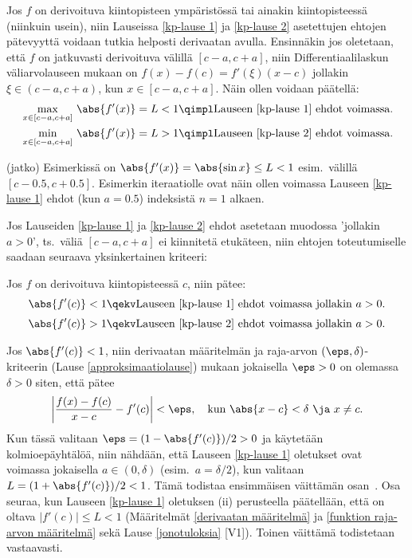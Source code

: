 Jos $f$ on derivoituva kiintopisteen ympäristössä tai ainakin kiintopisteessä (niinkuin usein),
niin Lauseissa \ref{kp-lause 1} ja \ref{kp-lause 2} asetettujen ehtojen pätevyyttä voidaan 
tutkia helposti derivaatan avulla. Ensinnäkin jos oletetaan, että $f$ on jatkuvasti derivoituva
välillä $[c-a,c+a]$, niin Differentiaalilaskun väliarvolauseen mukaan on 
$f(x)-f(c) = f'(\xi)(x-c)$ jollakin $\xi \in (c-a,c+a)$, kun $x \in [c-a,c+a]$. Näin ollen
voidaan päätellä:
\begin{align*}
&\max_{x \in [c-a,c+a]}\,\abs{f'(x)} = L<1 
                      \qimpl \text{Lauseen \ref{kp-lause 1} ehdot voimassa}. \\
&\min_{x \in [c-a,c+a]}\,\abs{f'(x)} = L>1 
                      \qimpl \text{Lauseen \ref{kp-lause 2} ehdot voimassa}.
\end{align*}
\jatko\jatko \begin{Exa} (jatko) Esimerkissä on $\abs{f'(x)} = \abs{\sin x} \le L<1$ esim.\
välillä $[c-0.5,c+0.5]$. Esimerkin iteraatiolle ovat näin ollen voimassa Lauseen
\ref{kp-lause 1} ehdot (kun $a=0.5$) indeksistä $n=1$ alkaen. \loppu
\end{Exa} \seur
Jos Lauseiden \ref{kp-lause 1} ja \ref{kp-lause 2} ehdot asetetaan muodossa 'jollakin $a>0$', 
ts.\ väliä $[c-a,c+a]$ ei kiinnitetä etukäteen, niin ehtojen toteutumiselle saadaan seuraava 
yksinkertainen kriteeri:
\begin{Prop} \label{kp-prop} Jos $f$ on derivoituva kiintopisteessä $c$, niin pätee:
\begin{align*}
\abs{f'(c)} < 1 \qekv \text{Lauseen \ref{kp-lause 1} ehdot voimassa jollakin $a>0$}. \\[1mm]
\abs{f'(c)} > 1 \qekv \text{Lauseen \ref{kp-lause 2} ehdot voimassa jollakin $a>0$}.
\end{align*}
\end{Prop}
\tod Jos $\abs{f'(c)}<1$, niin derivaatan määritelmän ja raja-arvon $(\eps,\delta)$-kriteerin 
(Lause \ref{approksimaatiolause}) mukaan jokaisella $\eps>0$ on olemassa $\delta>0$ siten,
että pätee
\[
\left|\frac{f(x)-f(c)}{x-c} - f'(c)\right| < \eps, \quad 
                        \text{kun}\ \abs{x-c} < \delta\ \ja\ x \neq c.
\]
Kun tässä valitaan $\eps = (1-\abs{f'(c)})/2>0$ ja käytetään kolmioepäyhtälöä, niin nähdään, 
että Lauseen \ref{kp-lause 1} oletukset ovat voimassa jokaisella $a \in (0,\delta)$ 
(esim.\ $a=\delta/2$), kun valitaan $L = (1+\abs{f'(c)})/2<1$. Tämä todistaa ensimmäisen 
väittämän osan \fbox{$\impl$}\,. Osa \fbox{$\Leftarrow$} seuraa, kun Lauseen \ref{kp-lause 1}
oletuksen (ii) perusteella päätellään, että on oltava $|f'(c)| \le L < 1$ (Määritelmät
\ref{derivaatan määritelmä} ja \ref{funktion raja-arvon määritelmä} sekä Lause
\ref{jonotuloksia} [V1]). Toinen väittämä todistetaan vastaavasti. \loppu

